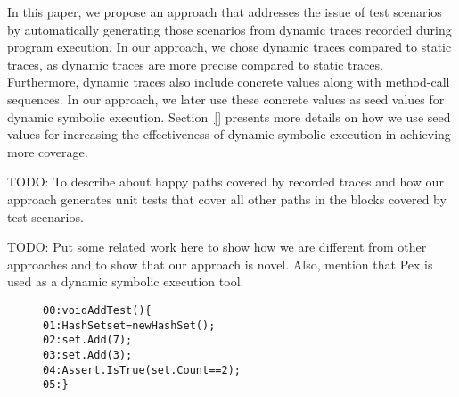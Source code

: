 In this paper, we propose an approach that addresses the issue of test scenarios by automatically 
generating those scenarios from dynamic traces recorded during program execution. In our approach,
we chose dynamic traces compared to static traces, as dynamic traces are more precise compared
to static traces. Furthermore, dynamic traces also include concrete values along with method-call
sequences. In our approach, we later use these concrete values as seed values for dynamic
symbolic execution. Section~\ref{} presents more details on how we use seed values for increasing
the effectiveness of dynamic symbolic execution in achieving more coverage.

TODO: To describe about happy paths covered by recorded traces and how our approach generates
unit tests that cover all other paths in the blocks covered by test scenarios.

TODO: Put some related work here to show how we are different from other approaches and 
to show that our approach is novel. Also, mention that Pex is used as a dynamic symbolic 
execution tool.

\begin{figure}[t]
\begin{CodeOut}
\begin{alltt}
00:void AddTest() \{
01:\hspace*{0.2in}HashSet set = new HashSet();
02:\hspace*{0.2in}set.Add(7);
03:\hspace*{0.2in}set.Add(3);
04:\hspace*{0.2in}Assert.IsTrue(set.Count == 2);
05:\}
\end{alltt}
\end{CodeOut}
\end{figure}

